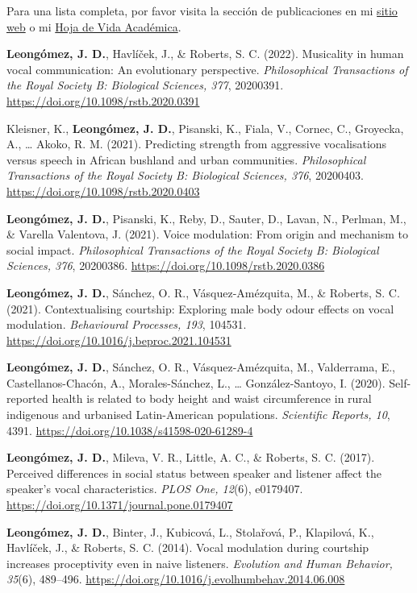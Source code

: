 \documentclass[11pt,a4paper,]{awesome-cv}
\begin{document}
Para una lista completa, por favor visita la sección de publicaciones en
mi \href{https://jdleongomez.info/es/publication/}{sitio web} o mi
\href{https://jdleongomez.info/es/files/jdl_cv_es.pdf}{Hoja de Vida
Académica}.

\begingroup
\setlength{\parindent}{-0.5in}
\setlength{\leftskip}{0.5in}

\textbf{Leongómez, J. D.}, Havlíček, J., \& Roberts, S. C. (2022).
Musicality in human vocal communication: An evolutionary perspective.
\emph{Philosophical Transactions of the Royal Society B: Biological
Sciences, 377}, 20200391. \url{https://doi.org/10.1098/rstb.2020.0391}

Kleisner, K., \textbf{Leongómez, J. D.}, Pisanski, K., Fiala, V.,
Cornec, C., Groyecka, A., \ldots{} Akoko, R. M. (2021). Predicting
strength from aggressive vocalisations versus speech in African bushland
and urban communities. \emph{Philosophical Transactions of the Royal
Society B: Biological Sciences, 376}, 20200403.
\url{https://doi.org/10.1098/rstb.2020.0403}

\textbf{Leongómez, J. D.}, Pisanski, K., Reby, D., Sauter, D., Lavan,
N., Perlman, M., \& Varella Valentova, J. (2021). Voice modulation: From
origin and mechanism to social impact. \emph{Philosophical Transactions
of the Royal Society B: Biological Sciences, 376}, 20200386.
\url{https://doi.org/10.1098/rstb.2020.0386}

\textbf{Leongómez, J. D.}, Sánchez, O. R., Vásquez-Amézquita, M., \&
Roberts, S. C. (2021). Contextualising courtship: Exploring male body
odour effects on vocal modulation. \emph{Behavioural Processes, 193},
104531. \url{https://doi.org/10.1016/j.beproc.2021.104531}

\textbf{Leongómez, J. D.}, Sánchez, O. R., Vásquez-Amézquita, M.,
Valderrama, E., Castellanos-Chacón, A., Morales-Sánchez, L., \ldots{}
González-Santoyo, I. (2020). Self-reported health is related to body
height and waist circumference in rural indigenous and urbanised
Latin-American populations. \emph{Scientific Reports, 10}, 4391.
\url{https://doi.org/10.1038/s41598-020-61289-4}

\textbf{Leongómez, J. D.}, Mileva, V. R., Little, A. C., \& Roberts, S.
C. (2017). Perceived differences in social status between speaker and
listener affect the speaker's vocal characteristics. \emph{PLOS One,
12}(6), e0179407. \url{https://doi.org/10.1371/journal.pone.0179407}

\textbf{Leongómez, J. D.}, Binter, J., Kubicová, L., Stolařová, P.,
Klapilová, K., Havlíček, J., \& Roberts, S. C. (2014). Vocal modulation
during courtship increases proceptivity even in naive listeners.
\emph{Evolution and Human Behavior, 35}(6), 489--496.
\url{https://doi.org/10.1016/j.evolhumbehav.2014.06.008}
\end{document}

